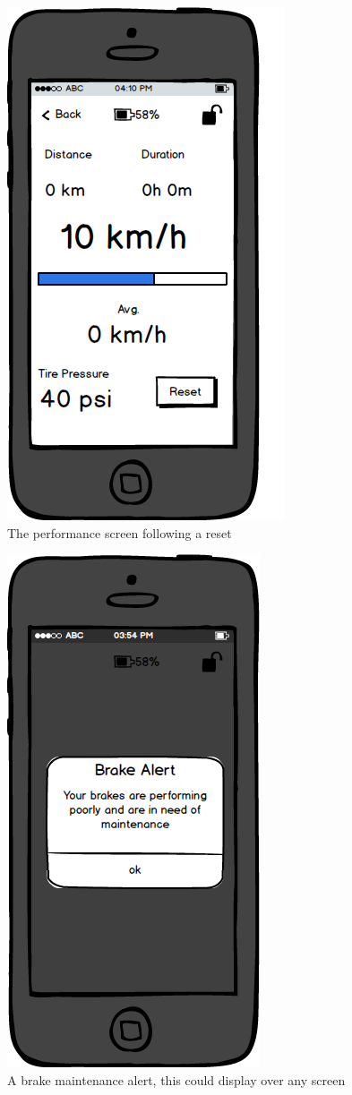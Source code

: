 \documentclass[a4paper]{report}
\begin{document}
\clearpage
\begin{figure}
\centering
\includegraphics[scale=0.9]{figures/prototype_1/resetted}
\caption{The performance screen following a reset}
\end{figure}
\clearpage
\begin{figure}
\centering
\includegraphics[scale=0.9]{figures/prototype_1/brake_maint}
\caption{A brake maintenance alert, this could display over any screen}
\end{figure}
\end{document}
